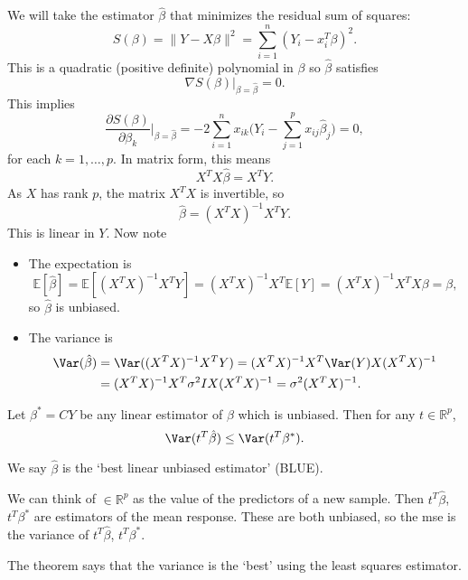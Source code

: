 \documentclass[12pt]{article}
\begin{document}
We will take the estimator $\hat \beta$ that minimizes the residual sum of squares:
\[
S(\beta) = \|Y-X\beta\|^2 = \sum_{i=1}^{n}(Y_i-x_i^{T}\beta)^2.
\]
This is a quadratic (positive definite) polynomial in $\beta$ so $\hat \beta$ satisfies
\[
\nabla S(\beta)\biggl|_{\beta=\hat\beta} =0.
\]
This implies
\[
\frac{\partial S(\beta)}{\partial \beta_k}\biggr|_{\beta=\hat \beta}=-2 \sum_{i=1}^nx_{ik}\biggl(Y_i - \sum_{j=1}^{p}x_{ij}\hat\beta_j\biggr) = 0,
\]
for each $k = 1, \ldots, p$. In matrix form, this means
\[
X^{T}X\hat\beta=X^TY.
\]
As $X$ has rank $p$, the matrix $X^{T}X$ is invertible, so
\[
\hat \beta = (X^{T}X)^{-1}X^TY.
\]
This is linear in $Y$. Now note
\begin{itemize}
	\item The expectation is
		\[
		\mathbb{E}[\hat \beta] = \mathbb{E}[(X^{T}X)^{-1}X^{T}Y] = (X^{T}X)^{-1}X^T \mathbb{E}[Y] = (X^{T}X)^{-1}X^{T}X\beta = \beta,
		\]
		so $\hat\beta$ is unbiased.
	\item The variance is
		\begin{align*}
			\Var(\hat\beta) &= \Var((X^{T}X)^{-1}X^{T}Y) = (X^{T}X)^{-1}X^{T}\Var(Y)X(X^{T}X)^{-1}\\
					&=(X^{T}X)^{-1}X^{T}\sigma^2IX(X^{T}X)^{-1} = \sigma^2(X^{T}X)^{-1}.
		\end{align*}
\end{itemize}

\begin{theorem}
	Let $\beta^{\ast} = CY$ be any linear estimator of $\beta$ which is unbiased. Then for any $t \in \mathbb{R}^{p}$,
	\[
	\Var(t^{T}\hat \beta)\le\Var(t^{T}\beta^{\ast}).
	\]
\end{theorem}

We say $\hat \beta$ is the `best linear unbiased estimator' (BLUE).

\begin{remark}
	We can think of $ \in \mathbb{R}^{p}$ as the value of the predictors of a new sample. Then $t^{T}\hat \beta$, $t^{T}\beta^{\ast}$ are estimators of the mean response. These are both unbiased, so the mse is the variance of $t^{T}\hat \beta$, $t^{T}\beta^{\ast}$.

	The theorem says that the variance is the `best' using the least squares estimator.
\end{remark}
\end{document}
